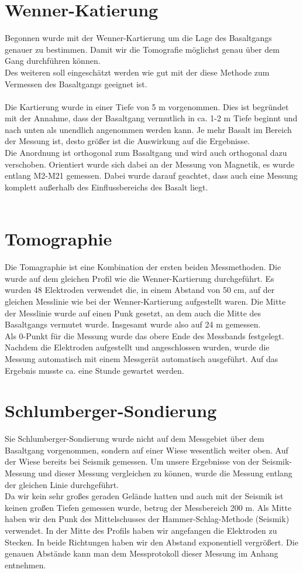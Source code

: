 \section{Wenner-Katierung}
Begonnen wurde mit der Wenner-Kartierung um die Lage des Basaltgangs genauer zu bestimmen. Damit wir die Tomografie möglichst genau über dem Gang durchführen
können. \\
Des weiteren soll eingeschätzt werden wie gut mit der diese Methode zum Vermessen des Basaltgangs geeignet ist.\\
\\
Die Kartierung wurde in einer Tiefe von 5 m vorgenommen. Dies ist begründet mit der Annahme, dass der Basaltgang vermutlich in ca. 1-2 m Tiefe beginnt und nach unten 
als unendlich angenommen werden kann. Je mehr Basalt im Bereich der Messung ist, desto größer ist die Auswirkung auf die Ergebnisse.\\
Die Anordnung ist orthogonal zum Basaltgang und wird auch orthogonal dazu verschoben. Orientiert wurde sich dabei an der Messung von Magnetik, es wurde 
entlang M2-M21 gemessen. Dabei wurde darauf geachtet, dass auch eine Messung komplett außerhalb 
des Einflussbereichs des Basalt liegt.\\
\\

\section{Tomographie}
Die Tomagraphie ist eine Kombination der ersten beiden Messmethoden. Die wurde auf dem gleichen Profil wie die Wenner-Kartierung durchgeführt.
Es wurden 48 Elektroden verwendet die, in einem Abstand von 50 cm, auf der gleichen Messlinie wie bei der Wenner-Kartierung aufgestellt waren. 
Die Mitte der Messlinie wurde auf einen Punk gesetzt, an dem auch die Mitte des Basaltgangs vermutet wurde. Insgesamt wurde also auf 24 m gemessen.\\
Als 0-Punkt für die Messung wurde das obere Ende des Messbands festgelegt.
Nachdem die Elektroden aufgestellt und angeschlossen wurden, wurde die Messung automatisch mit einem Messgerät automatisch ausgeführt. Auf das Ergebnis musste ca. 
eine Stunde gewartet werden.

\section{Schlumberger-Sondierung}
Sie Schlumberger-Sondierung wurde nicht auf dem Messgebiet über dem Basaltgang vorgenommen, sondern auf einer Wiese wesentlich weiter oben. Auf der Wiese 
bereits bei Seismik gemessen. Um unsere Ergebnisse von der Seismik-Messung und dieser Messung vergleichen zu können, wurde die Messung entlang der gleichen
Linie durchgeführt. \\
Da wir kein sehr großes geraden Gelände hatten und auch mit der Seismik ist keinen großen Tiefen gemessen wurde, betrug der Messbereich 200 m. Als Mitte 
haben wir den Punk des Mittelschusses der Hammer-Schlag-Methode (Seismik) verwendet.
In der Mitte des Profils haben wir angefangen die Elektroden zu Stecken. In beide Richtungen haben wir den Abstand exponentiell vergrößert. Die genauen Abstände kann man dem Messprotokoll dieser Messung im Anhang entnehmen.

